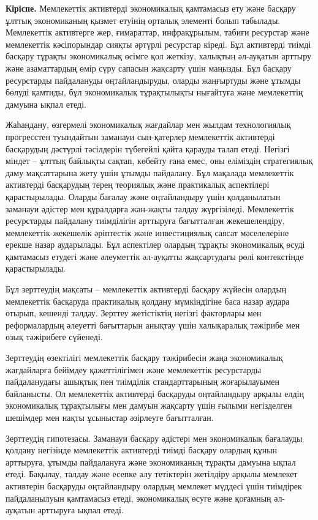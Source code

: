 \begin{multicols}{2}
{\bfseries Кіріспе.} Мемлекеттік активтерді экономикалық қамтамасыз ету
және басқару ұлттық экономиканың қызмет етуінің орталық элементі болып
табылады. Мемлекеттік активтерге жер, ғимараттар, инфрақұрылым, табиғи
ресурстар және мемлекеттік кәсіпорындар сияқты әртүрлі ресурстар кіреді.
Бұл активтерді тиімді басқару тұрақты экономикалық өсімге қол жеткізу,
халықтың әл-ауқатын арттыру және азаматтардың өмір сүру сапасын жақсарту
үшін маңызды. Бұл басқару ресурстарды пайдалануды оңтайландыруды, оларды
жаңғыртуды және ұтымды бөлуді қамтиды, бұл экономикалық тұрақтылықты
нығайтуға және мемлекеттің дамуына ықпал етеді.

Жаһандану, өзгермелі экономикалық жағдайлар мен жылдам технологиялық
прогресстен туындайтын заманауи сын-қатерлер мемлекеттік активтерді
басқарудың дәстүрлі тәсілдерін түбегейлі қайта қарауды талап етеді.
Негізгі міндет -- ұлттық байлықты сақтап, көбейту ғана емес, оны
еліміздің стратегиялық даму мақсаттарына жету үшін ұтымды пайдалану. Бұл
мақалада мемлекеттік активтерді басқарудың терең теориялық және
практикалық аспектілері қарастырылады. Оларды бағалау және оңтайландыру
үшін қолданылатын заманауи әдістер мен құралдарға жан-жақты талдау
жүргізіледі. Мемлекеттік ресурстарды пайдалану тиімділігін арттыруға
бағытталған жекешелендіру, мемлекеттік-жекешелік әріптестік және
инвестициялық саясат мәселелеріне ерекше назар аударылады. Бұл
аспектілер олардың тұрақты экономикалық өсуді қамтамасыз етудегі және
әлеуметтік әл-ауқатты жақсартудағы рөлі контекстінде қарастырылады.

Бұл зерттеудің мақсаты -- мемлекеттік активтерді басқару жүйесін олардың
мемлекеттік басқаруда практикалық қолдану мүмкіндігіне баса назар аудара
отырып, кешенді талдау. Зерттеу жетістіктің негізгі факторлары мен
реформалардың әлеуетті бағыттарын анықтау үшін халықаралық тәжірибе мен
озық тәжірибеге сүйенеді.

Зерттеудің өзектілігі мемлекеттік басқару тәжірибесін жаңа экономикалық
жағдайларға бейімдеу қажеттілігімен және мемлекеттік ресурстарды
пайдаланудағы ашықтық пен тиімділік стандарттарының жоғарылауымен
байланысты. Ол мемлекеттік активтерді басқаруды оңтайландыру арқылы
елдің экономикалық тұрақтылығы мен дамуын жақсарту үшін ғылыми
негізделген шешімдер мен нақты ұсыныстар әзірлеуге бағытталған.

Зерттеудің гипотезасы. Заманауи басқару әдістері мен экономикалық
бағалауды қолдану негізінде мемлекеттік активтерді тиімді басқару
олардың құнын арттыруға, ұтымды пайдалануға және экономиканың тұрақты
дамуына ықпал етеді. Бақылау, талдау және есепке алу тетіктерін
жетілдіру арқылы мемлекет активтерін басқаруды оңтайландыру олардың
мемлекет мүддесі үшін тиімдірек пайдаланылуын қамтамасыз етеді,
экономикалық өсуге және қоғамның әл-ауқатын арттыруға ықпал етеді.


\end{multicols}
